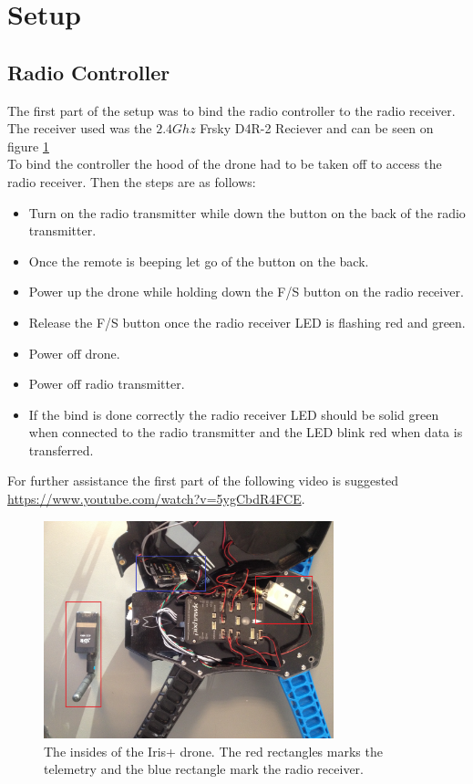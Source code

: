 \section{Setup}
\subsection*{Radio Controller}
The first part of the setup was to bind the radio controller to the radio receiver. The receiver
used was the $2.4 Ghz$ Frsky D4R-2 Reciever \cite{Ref:FrSky} and can be seen on figure
\ref{fig:irisInside}\\
To bind the controller the hood of the drone had to be taken off to access the radio receiver. Then
the steps are as follows:
\begin{itemize}
\item[1.] Turn on the radio transmitter while down the button on the back of the radio transmitter.
\item[2.] Once the remote is beeping let go of the button on the back.
\item[3.] Power up the drone while holding down the F/S button on the radio receiver.
\item[4.] Release the F/S button once the radio receiver LED is flashing red and green.
\item[5.] Power off drone.
\item[6.] Power off radio transmitter.
\item[7.] If the bind is done correctly the radio receiver LED should be solid green when connected
to the radio transmitter and the LED blink red when data is transferred.
\end{itemize}
For further assistance the first part of the following video is suggested
\url{https://www.youtube.com/watch?v=5ygCbdR4FCE}.

\begin{figure}[H]
  \centering
    \includegraphics[width=0.75\textwidth]{./Images/insideIRIS}
\caption{The insides of the Iris+ drone. The red rectangles marks the telemetry and the blue
rectangle mark the radio receiver.}
  \label{fig:irisInside}
\end{figure}


